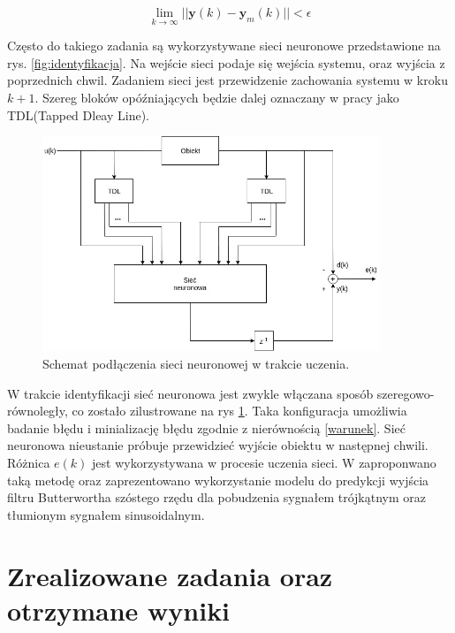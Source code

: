 \documentclass{article}
\newcommand{\bb}{\textbf}
\begin{document}
\begin{equation}
	\displaystyle{\lim_{k \to \infty}} ||\bb{y}(k)-\bb{y}_m(k)|| < \epsilon
\end{equation}

Często do takiego zadania są wykorzystywane sieci neuronowe przedstawione na rys. \ref{fig:identyfikacja}. Na wejście sieci podaje się wejścia systemu, oraz wyjścia z poprzednich chwil. Zadaniem sieci jest przewidzenie zachowania systemu w kroku $k+1$. Szereg bloków opóźniających będzie dalej oznaczany w pracy jako TDL(Tapped Dleay Line).

\begin{figure}
\centering
	\includegraphics[width=0.90\textwidth]{ident2.jpg}\par\vspace{1cm}
\caption{Schemat podłączenia sieci neuronowej w trakcie uczenia.}
	\label{fig:identyfikacja2}
\end{figure}

W trakcie identyfikacji sieć neuronowa jest zwykle włączana sposób szeregowo-równoległy, co zostało zilustrowane na rys \ref{fig:identyfikacja2}. Taka konfiguracja umożliwia badanie błędu i minializację błędu zgodnie z nierównością \ref{warunek}. Sieć neuronowa nieustanie próbuje przewidzieć wyjście obiektu w następnej chwili. Różnica $e(k)$ jest wykorzystywana w procesie uczenia sieci. W \cite{Osowski} zaproponwano taką metodę oraz zaprezentowano wykorzystanie modelu do predykcji wyjścia filtru Butterwortha szóstego rzędu dla pobudzenia sygnałem trójkątnym oraz tłumionym sygnałem sinusoidalnym.

\section{Zrealizowane zadania oraz otrzymane wyniki}
\end{document}
